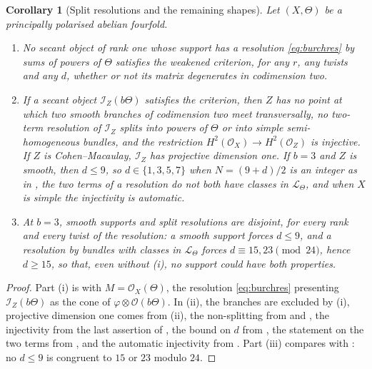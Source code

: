 \documentclass[11pt,reqno]{amsart}
\theoremstyle{plain}
\newtheorem{corollary}[theorem]{Corollary}
\theoremstyle{definition}
\theoremstyle{remark}
\newcommand{\cO}{\mathcal{O}}
\newcommand{\cL}{\mathcal{L}}
\newcommand{\cI}{\mathcal{I}}
\begin{document}
\begin{corollary}[Split resolutions and the remaining shapes]
\label{cor:disjointroutes}
Let $(X,\Theta)$ be a principally polarised abelian fourfold.
\begin{enumerate}[label=\textup{(\roman*)},nosep]
\item No secant object of rank one whose support has a resolution
  \eqref{eq:burchres} by sums of powers of $\Theta$ satisfies the weakened
  criterion, for any $r$, any twists and any $d$, whether or not its matrix
  degenerates in codimension two.
\item If a secant object $\cI_{Z}(b\Theta)$ satisfies the criterion, then
  $Z$ has no point at which two smooth branches of codimension two meet
  transversally, no two-term resolution of $\cI_{Z}$ splits into powers of
  $\Theta$ or into simple semi-homogeneous bundles, and the restriction
  $H^{2}(\cO_{X})\to H^{2}(\cO_{Z})$ is injective. If $Z$ is
  Cohen--Macaulay, $\cI_{Z}$ has projective dimension one. If $b=3$ and $Z$
  is smooth, then $d\le9$, so $d\in\{1,3,5,7\}$ when $N=(9+d)/2$ is an
  integer as in , the two terms of a resolution do not
  both have classes in $\cL_{\Theta}$, and when $X$ is simple the
  injectivity is automatic.
\item At $b=3$, smooth supports and split resolutions are disjoint, for
  every rank and every twist of the resolution: a smooth support forces
  $d\le9$, and a resolution by bundles with classes in $\cL_{\Theta}$ forces
  $d\equiv15,23\pmod{24}$, hence $d\ge15$, so that, even without (i), no
  support could have both properties.
\end{enumerate}
\end{corollary}

\begin{proof}
Part (i) is  with $M=\cO_{X}(\Theta)$, the resolution
\eqref{eq:burchres} presenting $\cI_{Z}(b\Theta)$ as the cone of
$\varphi\otimes\cO(b\Theta)$. In (ii), the branches are excluded by
(i), projective dimension one comes from
(ii), the non-splitting from  and
, the injectivity from the last assertion of
, the bound on $d$ from
, the statement on the two terms from
, and the automatic injectivity from
. Part (iii) compares
 with : no $d\le9$ is
congruent to $15$ or $23$ modulo $24$.
\end{proof}
\end{document}
